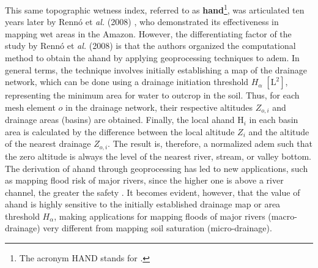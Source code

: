 \documentclass[./main_en.tex]{subfiles}
\begin{document}
\par This same topographic wetness index, referred to as \textbf{\gls{hand}}\footnote{The acronym HAND stands for .}, was articulated ten years later by Rennó et \textit{al.} (2008) \cite{Renno2008a}, who demonstrated its effectiveness in mapping wet areas in the Amazon. However, the differentiating factor of the study by Rennó et \textit{al.} (2008) is that the authors organized the computational method to obtain the \acrshort{ahand} by applying geoprocessing techniques to \acrshort{adem}. In general terms, the technique involves initially establishing a map of the drainage network, which can be done using a drainage initiation threshold $H_{\alpha}\;[\text{L}^2]$, representing the minimum area for water to outcrop in the soil. Thus, for each mesh element $o$ in the drainage network, their respective altitudes $Z_{o, i}$ and drainage areas (basins) are obtained. Finally, the local \acrshort{ahand} $\text{H}_i$ in each basin area is calculated by the difference between the local altitude $Z_{i}$ and the altitude of the nearest drainage $Z_{o, i}$. The result is, therefore, a normalized \acrlong{adem} such that the zero altitude is always the level of the nearest river, stream, or valley bottom. The derivation of \acrshort{ahand} through geoprocessing has led to new applications, such as mapping flood risk of major rivers, since the higher one is above a river channel, the greater the safety \cite{Nobre2016a}. It becomes evident, however, that the value of \acrshort{ahand} is highly sensitive to the initially established drainage map or area threshold $H_{\alpha}$, making applications for mapping floods of major rivers (macro-drainage) very different from mapping soil saturation (micro-drainage).
\end{document}

